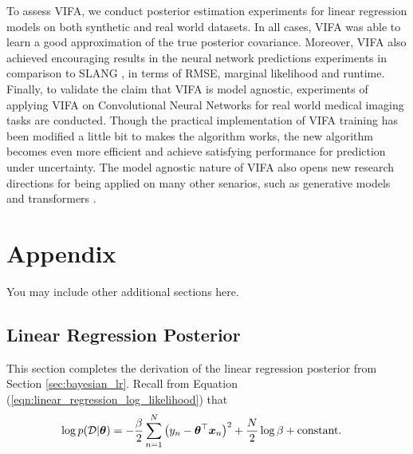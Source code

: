 \documentclass[10pt]{article} %
\begin{document}
To assess VIFA, we conduct posterior estimation experiments for linear regression models on both synthetic and real world datasets. In all cases,
VIFA was able to learn a good approximation of the true posterior covariance. Moreover, VIFA also achieved encouraging results in the neural network predictions experiments in comparison to SLANG \citep{mishkin2018}, in terms of RMSE, marginal likelihood and runtime. Finally, to validate the claim that VIFA is model agnostic, experiments of applying VIFA on Convolutional Neural Networks for real world medical imaging tasks are conducted. Though the practical implementation of VIFA training has been modified a little bit to makes the algorithm works, the new algorithm becomes even more efficient and achieve satisfying performance for prediction under uncertainty. The model agnostic nature of VIFA also opens new research directions for being applied on many other senarios, such as generative models \citep{harshvardhan2020comprehensive} and transformers \citep{vaswani2017attention}. 
 





\appendix

\section{Appendix}

You may include other additional sections here.

\subsection{Linear Regression Posterior}
\label{app:bayesian_linear_regression_posterior}
 
This section completes the derivation of the linear regression posterior from Section \ref{sec:bayesian_lr}. Recall from Equation (\ref{eqn:linear_regression_log_likelihood}) that
\begin{align}
\begin{split}
    \log p(\mathcal{D} | {\bm{\theta}}) & = - \frac{\beta}{2} \sum_{n=1}^N \big(y_n - {\bm{\theta}}^\top {\bm{x}}_n \big)^2 + \frac{N}{2} \log \beta + \text{constant}.
\end{split}
\end{align}
\end{document}
